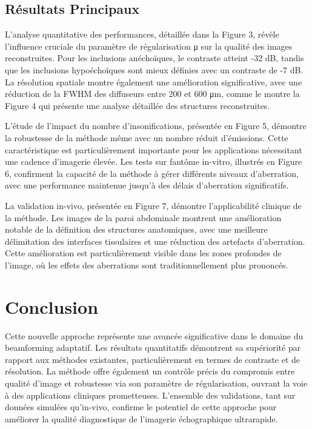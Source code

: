 \documentclass[12pt,a4paper]{article}
\begin{document}
\subsection{Résultats Principaux}
L'analyse quantitative des performances, détaillée dans la Figure 3, révèle l'influence cruciale du paramètre de régularisation μ sur la qualité des images reconstruites. Pour les inclusions anéchoïques, le contraste atteint -32 dB, tandis que les inclusions hypoéchoïques sont mieux définies avec un contraste de -7 dB. La résolution spatiale montre également une amélioration significative, avec une réduction de la FWHM des diffuseurs entre 200 et 600 μm, comme le montre la Figure 4 qui présente une analyse détaillée des structures reconstruites.

L'étude de l'impact du nombre d'insonifications, présentée en Figure 5, démontre la robustesse de la méthode même avec un nombre réduit d'émissions. Cette caractéristique est particulièrement importante pour les applications nécessitant une cadence d'imagerie élevée. Les tests sur fantôme in-vitro, illustrés en Figure 6, confirment la capacité de la méthode à gérer différents niveaux d'aberration, avec une performance maintenue jusqu'à des délais d'aberration significatifs.

La validation in-vivo, présentée en Figure 7, démontre l'applicabilité clinique de la méthode. Les images de la paroi abdominale montrent une amélioration notable de la définition des structures anatomiques, avec une meilleure délimitation des interfaces tissulaires et une réduction des artefacts d'aberration. Cette amélioration est particulièrement visible dans les zones profondes de l'image, où les effets des aberrations sont traditionnellement plus prononcés.

\section{Conclusion}
Cette nouvelle approche représente une avancée significative dans le domaine du beamforming adaptatif. Les résultats quantitatifs démontrent sa supériorité par rapport aux méthodes existantes, particulièrement en termes de contraste et de résolution. La méthode offre également un contrôle précis du compromis entre qualité d'image et robustesse via son paramètre de régularisation, ouvrant la voie à des applications cliniques prometteuses. L'ensemble des validations, tant sur données simulées qu'in-vivo, confirme le potentiel de cette approche pour améliorer la qualité diagnostique de l'imagerie échographique ultrarapide.
\end{document}
